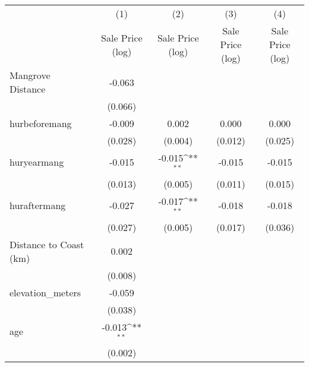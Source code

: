 {
\def\sym#1{\ifmmode^{#1}\else\(^{#1}\)\fi}
\begin{tabular}{l*{4}{c}}
\hline\hline
                    &\multicolumn{1}{c}{(1)}&\multicolumn{1}{c}{(2)}&\multicolumn{1}{c}{(3)}&\multicolumn{1}{c}{(4)}\\
                    &\multicolumn{1}{c}{Sale Price (log)}&\multicolumn{1}{c}{Sale Price (log)}&\multicolumn{1}{c}{Sale Price (log)}&\multicolumn{1}{c}{Sale Price (log)}\\
\hline
Mangrove Distance   &      -0.063         &                     &                     &                     \\
                    &     (0.066)         &                     &                     &                     \\
[1em]
hurbeforemang       &      -0.009         &       0.002         &       0.000         &       0.000         \\
                    &     (0.028)         &     (0.004)         &     (0.012)         &     (0.025)         \\
[1em]
huryearmang         &      -0.015         &      -0.015\sym{**} &      -0.015         &      -0.015         \\
                    &     (0.013)         &     (0.005)         &     (0.011)         &     (0.015)         \\
[1em]
huraftermang        &      -0.027         &      -0.017\sym{**} &      -0.018         &      -0.018         \\
                    &     (0.027)         &     (0.005)         &     (0.017)         &     (0.036)         \\
[1em]
Distance to Coast (km)&       0.002         &                     &                     &                     \\
                    &     (0.008)         &                     &                     &                     \\
[1em]
elevation\_meters    &      -0.059         &                     &                     &                     \\
                    &     (0.038)         &                     &                     &                     \\
[1em]
age                 &      -0.013\sym{**} &                     &                     &                     \\
                    &     (0.002)         &                     &                     &                     \\

\end{tabular}}
